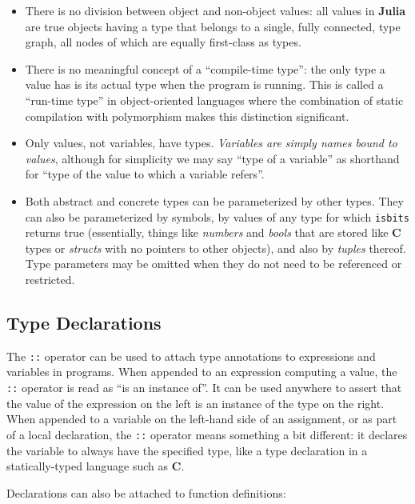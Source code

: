 \documentclass[
]{article}
\providecommand{\tightlist}{%
  \setlength{\itemsep}{0pt}\setlength{\parskip}{0pt}}
\begin{document}
\begin{itemize}
\tightlist
\item
  There is no division between object and non-object values: all values
  in \textbf{Julia} are true objects having a type that belongs to a
  single, fully connected, type graph, all nodes of which are equally
  first-class as types.
\item
  There is no meaningful concept of a ``compile-time type'': the only
  type a value has is its actual type when the program is running. This
  is called a ``run-time type'' in object-oriented languages where the
  combination of static compilation with polymorphism makes this
  distinction significant.
\item
  Only values, not variables, have types. \emph{Variables are simply
  names bound to values}, although for simplicity we may say ``type of a
  variable'' as shorthand for ``type of the value to which a variable
  refers''.
\item
  Both abstract and concrete types can be parameterized by other types.
  They can also be parameterized by symbols, by values of any type for
  which \texttt{isbits} returns true (essentially, things like
  \emph{numbers} and \emph{bools} that are stored like \textbf{C} types
  or \emph{structs} with no pointers to other objects), and also by
  \emph{tuples} thereof. Type parameters may be omitted when they do not
  need to be referenced or restricted.
\end{itemize}

\hypertarget{type-declarations}{%
\subsection{Type Declarations}\label{type-declarations}}

The \texttt{::} operator can be used to attach type annotations to
expressions and variables in programs. When appended to an expression
computing a value, the \texttt{::} operator is read as ``is an instance
of''. It can be used anywhere to assert that the value of the expression
on the left is an instance of the type on the right. When appended to a
variable on the left-hand side of an assignment, or as part of a local
declaration, the \texttt{::} operator means something a bit different:
it declares the variable to always have the specified type, like a type
declaration in a statically-typed language such as \textbf{C}.

Declarations can also be attached to function definitions:
\end{document}
